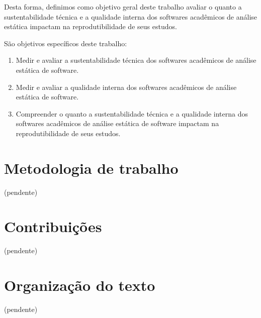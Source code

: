 Desta forma, definimos como objetivo geral deste trabalho avaliar o quanto a
sustentabilidade técnica e a qualidade interna dos softwares acadêmicos de
análise estática impactam na reprodutibilidade de seus estudos.

São objetivos específicos deste trabalho:

\begin{enumerate}
  \item Medir e avaliar a sustentabilidade técnica dos softwares acadêmicos de
        análise estática de software.
  \item Medir e avaliar a qualidade interna dos softwares acadêmicos de análise
        estática de software.
  \item Compreender o quanto a sustentabilidade técnica e a qualidade interna
        dos softwares acadêmicos de análise estática de software impactam na
        reprodutibilidade de seus estudos.
\end{enumerate}

\section{Metodologia de trabalho}

(pendente)

\section{Contribuições}

(pendente)

\section{Organização do texto}

(pendente)
